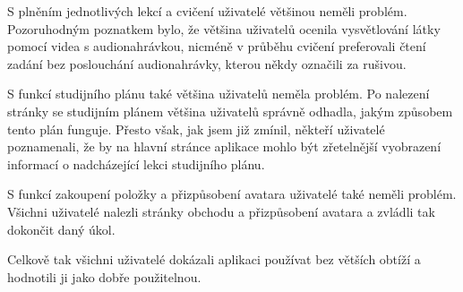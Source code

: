 S plněním jednotlivých lekcí a cvičení uživatelé většinou neměli problém. Pozoruhodným poznatkem bylo, že většina uživatelů ocenila vysvětlování látky pomocí videa s audionahrávkou, nicméně v průběhu cvičení preferovali čtení zadání bez poslouchání audionahrávky, kterou někdy označili za rušivou. 

S funkcí studijního plánu také většina uživatelů neměla problém. Po nalezení stránky se studijním plánem většina uživatelů správně odhadla, jakým způsobem tento plán funguje. Přesto však, jak jsem již zmínil, někteří uživatelé poznamenali, že by na hlavní stránce aplikace mohlo být zřetelnější vyobrazení informací o nadcházející lekci studijního plánu.

S funkcí zakoupení položky a přizpůsobení avatara uživatelé také neměli problém. Všichni uživatelé nalezli stránky obchodu a přizpůsobení avatara a zvládli tak dokončit daný úkol.

Celkově tak všichni uživatelé dokázali aplikaci používat bez větších obtíží a hodnotili ji jako dobře použitelnou.
